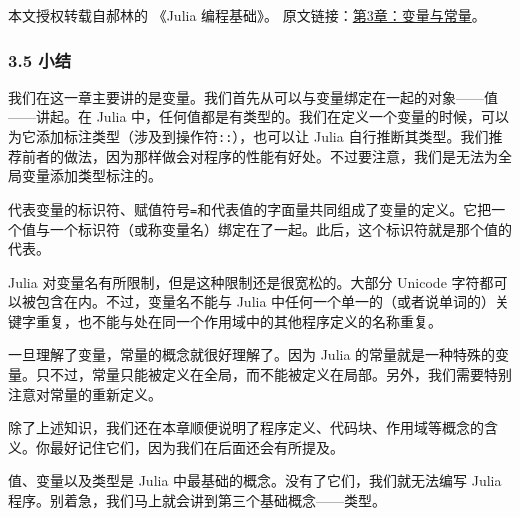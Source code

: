 
本文授权转载自郝林的 《Julia 编程基础》。 原文链接：\href{https://github.com/hyper0x/JuliaBasics/blob/master/book/ch03.md}{第3章：变量与常量}。


\subsubsection{3.5 小结}

我们在这一章主要讲的是变量。我们首先从可以与变量绑定在一起的对象——值——讲起。在 Julia 中，任何值都是有类型的。我们在定义一个变量的时候，可以为它添加标注类型（涉及到操作符\verb|::|），也可以让 Julia 自行推断其类型。我们推荐前者的做法，因为那样做会对程序的性能有好处。不过要注意，我们是无法为全局变量添加类型标注的。

代表变量的标识符、赋值符号\verb|=|和代表值的字面量共同组成了变量的定义。它把一个值与一个标识符（或称变量名）绑定在了一起。此后，这个标识符就是那个值的代表。

Julia 对变量名有所限制，但是这种限制还是很宽松的。大部分 Unicode 字符都可以被包含在内。不过，变量名不能与 Julia 中任何一个单一的（或者说单词的）关键字重复，也不能与处在同一个作用域中的其他程序定义的名称重复。

一旦理解了变量，常量的概念就很好理解了。因为 Julia 的常量就是一种特殊的变量。只不过，常量只能被定义在全局，而不能被定义在局部。另外，我们需要特别注意对常量的重新定义。

除了上述知识，我们还在本章顺便说明了程序定义、代码块、作用域等概念的含义。你最好记住它们，因为我们在后面还会有所提及。

值、变量以及类型是 Julia 中最基础的概念。没有了它们，我们就无法编写 Julia 程序。别着急，我们马上就会讲到第三个基础概念——类型。

